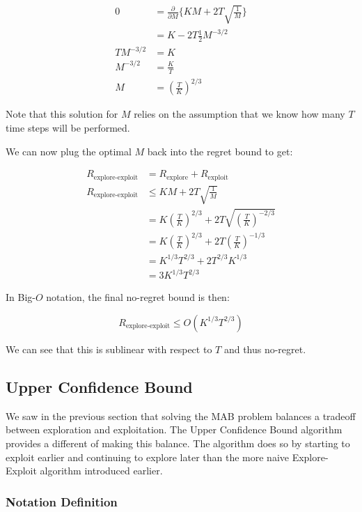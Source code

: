 \documentclass[11pt]{article}
\begin{document}
\begin{align}
    0 &= \frac{\partial}{\partial M} \{KM + 2T \sqrt{\frac{1}{M}}\} \\
    &= K - 2T \frac{1}{2} M^{-3/2} \\
    TM^{-3/2} &= K \\
    M^{-3/2} &= \frac{K}{T} \\
    M &= (\frac{T}{K})^{2/3}
\end{align}

Note that this solution for $M$ relies on the assumption that we know how many $T$ time steps will be performed.

We can now plug the optimal $M$ back into the regret bound to get:

\begin{align}
    R_{\text{explore-exploit}} &=  R_{\text{explore}} + R_{\text{exploit}} \\
    R_{\text{explore-exploit}} & \leq  KM + 2T\sqrt{\frac{1}{M}} \\
    &= K(\frac{T}{K})^{2/3} + 2T\sqrt{(\frac{T}{K})^{-2/3}} \\
    &=  K(\frac{T}{K})^{2/3} + 2T(\frac{T}{K})^{-1/3} \\
    &= K^{1/3}T^{2/3} + 2 T^{2/3} K^{1/3} \\
    &= 3K^{1/3} T^{2/3}
\end{align}

In Big-$O$ notation, the final no-regret bound is then:

\begin{equation}
    R_{\text{explore-exploit}} \leq O(K^{1/3} T^{2/3})
\end{equation}

We can see that this is sublinear with respect to $T$ and thus no-regret.
    
\subsection{Upper Confidence Bound}

We saw in the previous section that solving the MAB problem balances a tradeoff between exploration and exploitation. The Upper Confidence Bound algorithm provides a different of making this balance. The algorithm does so by starting to exploit earlier and continuing to explore later than the more naive Explore-Exploit algorithm introduced earlier. 

\subsubsection{Notation Definition}
\end{document}
